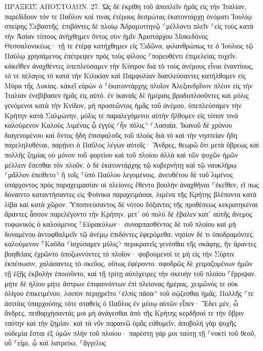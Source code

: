 \documentclass[twoside, 9pt]{extreport}
\begin{document}
ΠΡΑΞΕΙΣ ΑΠΟΣΤΟΛΩΝ.
27.
Ὡς δὲ ἐκρίθη τοῦ ἀποπλεῖν ἡμᾶς εἰς τὴν Ἰταλίαν, παρεδίδουν τόν τε Παῦλον καί τινας ἑτέρους δεσμώτας ἑκατοντάρχῃ ὀνόματι Ἰουλίῳ σπείρης Σεβαστῆς. 
ἐπιβάντες δὲ πλοίῳ Ἀδραμυττηνῷ ⸀μέλλοντι πλεῖν ⸀εἰς τοὺς κατὰ τὴν Ἀσίαν τόπους ἀνήχθημεν ὄντος σὺν ἡμῖν Ἀριστάρχου Μακεδόνος Θεσσαλονικέως· 
τῇ τε ἑτέρᾳ κατήχθημεν εἰς Σιδῶνα, φιλανθρώπως τε ὁ Ἰούλιος τῷ Παύλῳ χρησάμενος ἐπέτρεψεν πρὸς τοὺς φίλους ⸀πορευθέντι ἐπιμελείας τυχεῖν. 
κἀκεῖθεν ἀναχθέντες ὑπεπλεύσαμεν τὴν Κύπρον διὰ τὸ τοὺς ἀνέμους εἶναι ἐναντίους, 
τό τε πέλαγος τὸ κατὰ τὴν Κιλικίαν καὶ Παμφυλίαν διαπλεύσαντες κατήλθομεν εἰς Μύρα τῆς Λυκίας. 
κἀκεῖ εὑρὼν ὁ ⸀ἑκατοντάρχης πλοῖον Ἀλεξανδρῖνον πλέον εἰς τὴν Ἰταλίαν ἐνεβίβασεν ἡμᾶς εἰς αὐτό. 
ἐν ἱκαναῖς δὲ ἡμέραις βραδυπλοοῦντες καὶ μόλις γενόμενοι κατὰ τὴν Κνίδον, μὴ προσεῶντος ἡμᾶς τοῦ ἀνέμου, ὑπεπλεύσαμεν τὴν Κρήτην κατὰ Σαλμώνην, 
μόλις τε παραλεγόμενοι αὐτὴν ἤλθομεν εἰς τόπον τινὰ καλούμενον Καλοὺς Λιμένας ᾧ ἐγγὺς ⸂ἦν πόλις⸃ ⸀Λασαία. 
Ἱκανοῦ δὲ χρόνου διαγενομένου καὶ ὄντος ἤδη ἐπισφαλοῦς τοῦ πλοὸς διὰ τὸ καὶ τὴν νηστείαν ἤδη παρεληλυθέναι, παρῄνει ὁ Παῦλος 
λέγων αὐτοῖς· Ἄνδρες, θεωρῶ ὅτι μετὰ ὕβρεως καὶ πολλῆς ζημίας οὐ μόνον τοῦ φορτίου καὶ τοῦ πλοίου ἀλλὰ καὶ τῶν ψυχῶν ἡμῶν μέλλειν ἔσεσθαι τὸν πλοῦν. 
ὁ δὲ ἑκατοντάρχης τῷ κυβερνήτῃ καὶ τῷ ναυκλήρῳ ⸂μᾶλλον ἐπείθετο⸃ ἢ τοῖς ⸀ὑπὸ Παύλου λεγομένοις. 
ἀνευθέτου δὲ τοῦ λιμένος ὑπάρχοντος πρὸς παραχειμασίαν οἱ πλείονες ἔθεντο βουλὴν ἀναχθῆναι ⸀ἐκεῖθεν, εἴ πως δύναιντο καταντήσαντες εἰς Φοίνικα παραχειμάσαι, λιμένα τῆς Κρήτης βλέποντα κατὰ λίβα καὶ κατὰ χῶρον. 
Ὑποπνεύσαντος δὲ νότου δόξαντες τῆς προθέσεως κεκρατηκέναι ἄραντες ἆσσον παρελέγοντο τὴν Κρήτην. 
μετ᾽ οὐ πολὺ δὲ ἔβαλεν κατ᾽ αὐτῆς ἄνεμος τυφωνικὸς ὁ καλούμενος ⸀Εὐρακύλων· 
συναρπασθέντος δὲ τοῦ πλοίου καὶ μὴ δυναμένου ἀντοφθαλμεῖν τῷ ἀνέμῳ ἐπιδόντες ἐφερόμεθα. 
νησίον δέ τι ὑποδραμόντες καλούμενον ⸀Καῦδα ⸂ἰσχύσαμεν μόλις⸃ περικρατεῖς γενέσθαι τῆς σκάφης, 
ἣν ἄραντες βοηθείαις ἐχρῶντο ὑποζωννύντες τὸ πλοῖον· φοβούμενοί τε μὴ εἰς τὴν Σύρτιν ἐκπέσωσιν, χαλάσαντες τὸ σκεῦος, οὕτως ἐφέροντο. 
σφοδρῶς δὲ χειμαζομένων ἡμῶν τῇ ἑξῆς ἐκβολὴν ἐποιοῦντο, 
καὶ τῇ τρίτῃ αὐτόχειρες τὴν σκευὴν τοῦ πλοίου ⸀ἔρριψαν. 
μήτε δὲ ἡλίου μήτε ἄστρων ἐπιφαινόντων ἐπὶ πλείονας ἡμέρας, χειμῶνός τε οὐκ ὀλίγου ἐπικειμένου, λοιπὸν περιῃρεῖτο ⸂ἐλπὶς πᾶσα⸃ τοῦ σῴζεσθαι ἡμᾶς. 
Πολλῆς ⸀τε ἀσιτίας ὑπαρχούσης τότε σταθεὶς ὁ Παῦλος ἐν μέσῳ αὐτῶν εἶπεν· Ἔδει μέν, ὦ ἄνδρες, πειθαρχήσαντάς μοι μὴ ἀνάγεσθαι ἀπὸ τῆς Κρήτης κερδῆσαί τε τὴν ὕβριν ταύτην καὶ τὴν ζημίαν. 
καὶ τὰ νῦν παραινῶ ὑμᾶς εὐθυμεῖν, ἀποβολὴ γὰρ ψυχῆς οὐδεμία ἔσται ἐξ ὑμῶν πλὴν τοῦ πλοίου· 
παρέστη γάρ μοι ταύτῃ τῇ ⸀νυκτὶ τοῦ θεοῦ, οὗ ⸀εἰμι, ᾧ καὶ λατρεύω, ⸀ἄγγελος 
\end{document}
